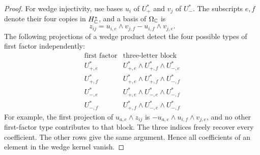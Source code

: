 \begin{proof}
For wedge injectivity, use bases $u_i$ of $U_+^*$ and $v_j$ of $U_-^*$.
The subscripts $e,f$ denote their four copies in $H_\mathbb C^*$, and a basis
of $\Omega_\mathbb C$ is
\[
 z_{ij}=u_{i,e}\wedge v_{j,f}-u_{i,f}\wedge v_{j,e}.
\]
The following projections of a wedge product detect the four possible
types of first factor independently:
\[
\begin{array}{c|c}
 \text{first factor}&\text{three-letter block}\\ \hline
 U_{+,e}^*&U_{+,e}^*\wedge U_{+,f}^*\wedge U_{-,e}^*\\
 U_{+,f}^*&U_{+,e}^*\wedge U_{+,f}^*\wedge U_{-,f}^*\\
 U_{-,e}^*&U_{+,e}^*\wedge U_{-,e}^*\wedge U_{-,f}^*\\
 U_{-,f}^*&U_{+,f}^*\wedge U_{-,e}^*\wedge U_{-,f}^*
\end{array}
\]
For example, the first projection of $u_{a,e}\wedge z_{ij}$ is
$-u_{a,e}\wedge u_{i,f}\wedge v_{j,e}$, and no other first-factor
type contributes to that block.  The three indices freely recover
every coefficient.  The other rows give the same argument.  Hence all
coefficients of an element in the wedge kernel vanish.
\end{proof}

